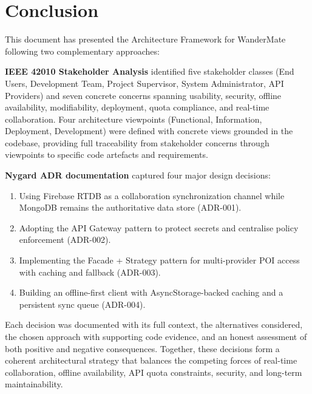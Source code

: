 \documentclass[12pt, a4paper]{article}
\begin{document}
\section{Conclusion}

This document has presented the Architecture Framework for WanderMate following two complementary approaches:

\textbf{IEEE 42010 Stakeholder Analysis} identified five stakeholder classes (End Users, Development Team, Project Supervisor, System Administrator, API Providers) and seven concrete concerns spanning usability, security, offline availability, modifiability, deployment, quota compliance, and real-time collaboration. Four architecture viewpoints (Functional, Information, Deployment, Development) were defined with concrete views grounded in the codebase, providing full traceability from stakeholder concerns through viewpoints to specific code artefacts and requirements.

\textbf{Nygard ADR documentation} captured four major design decisions:
\begin{enumerate}
  \item Using Firebase RTDB as a collaboration synchronization channel while MongoDB remains the authoritative data store (ADR-001).
  \item Adopting the API Gateway pattern to protect secrets and centralise policy enforcement (ADR-002).
  \item Implementing the Facade + Strategy pattern for multi-provider POI access with caching and fallback (ADR-003).
  \item Building an offline-first client with AsyncStorage-backed caching and a persistent sync queue (ADR-004).
\end{enumerate}

Each decision was documented with its full context, the alternatives considered, the chosen approach with supporting code evidence, and an honest assessment of both positive and negative consequences. Together, these decisions form a coherent architectural strategy that balances the competing forces of real-time collaboration, offline availability, API quota constraints, security, and long-term maintainability.
\end{document}
